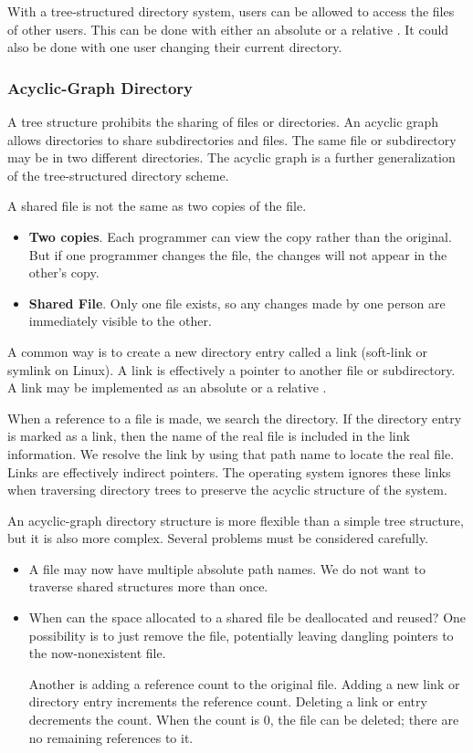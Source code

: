 With a tree-structured directory system, users can be allowed to access the files of other users.
This can be done with either an absolute or a relative .
It could also be done with one user changing their current directory.

\subsubsection{Acyclic-Graph Directory}\label{subsubsec:Acyclic_Graph_Directory}
A tree structure prohibits the sharing of files or directories.
An acyclic graph allows directories to share subdirectories and files.
The same file or subdirectory may be in two different directories.
The acyclic graph is a further generalization of the tree-structured directory scheme.

A shared file is not the same as two copies of the file.
\begin{itemize}[noitemsep]
\item \textbf{Two copies}.
  Each programmer can view the copy rather than the original.
  But if one programmer changes the file, the changes will not appear in the other’s copy.
\item \textbf{Shared File}.
  Only one file exists, so any changes made by one person are immediately visible to the other.
\end{itemize}

A common way is to create a new directory entry called a link (soft-link or symlink on Linux).
A link is effectively a pointer to another file or subdirectory.
A link may be implemented as an absolute or a relative .

When a reference to a file is made, we search the directory.
If the directory entry is marked as a link, then the name of the real file is included in the link information.
We resolve the link by using that path name to locate the real file.
Links are effectively indirect pointers.
The operating system ignores these links when traversing directory trees to preserve the acyclic structure of the system.

An acyclic-graph directory structure is more flexible than a simple tree structure, but it is also more complex.
Several problems must be considered carefully.
\begin{itemize}[noitemsep]
\item A file may now have multiple absolute path names.
  We do not want to traverse shared structures more than once.

\item When can the space allocated to a shared file be deallocated and reused?
  One possibility is to just remove the file, potentially leaving dangling pointers to the now-nonexistent file.

  Another is adding a reference count to the original file.
  Adding a new link or directory entry increments the reference count.
  Deleting a link or entry decrements the count.
  When the count is 0, the file can be deleted; there are no remaining references to it.
\end{itemize}


